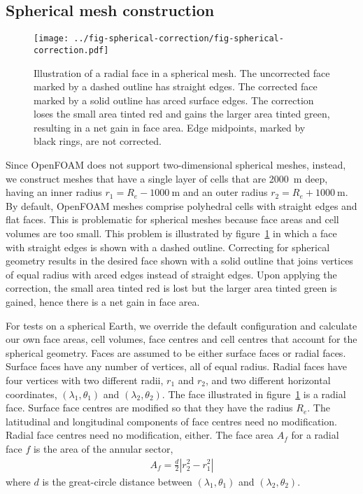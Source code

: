 \subsection*{Spherical mesh construction}

\begin{figure}
	\centering
	\texttt{[image: ../fig-spherical-correction/fig-spherical-correction.pdf]}
	\caption{Illustration of a radial face in a spherical mesh.  The uncorrected face marked by a dashed outline has straight edges.  The corrected face marked by a solid outline has arced surface edges.
	The correction loses the small area tinted red and gains the larger area tinted green, resulting in a net gain in face area.
	Edge midpoints, marked by black rings, are not corrected.}
	\label{fig:spherical-correction}
\end{figure}

Since OpenFOAM does not support two-dimensional spherical meshes, instead, we construct meshes that have a single layer of cells that are \SI{2000}{\meter} deep, having an inner radius $r_1 = R_e - \SI{1000}{\meter}$ and an outer radius $r_2 = R_e + \SI{1000}{\meter}$.
By default, OpenFOAM meshes comprise polyhedral cells with straight edges and flat faces.  This is problematic for spherical meshes because face areas and cell volumes are too small.  This problem is illustrated by figure~\ref{fig:spherical-correction} in which a face with straight edges is shown with a dashed outline.
Correcting for spherical geometry results in the desired face shown with a solid outline that joins vertices of equal radius with arced edges instead of straight edges.  Upon applying the correction, the small area tinted red is lost but the larger area tinted green is gained, hence there is a net gain in face area.

For tests on a spherical Earth, we override the default configuration and calculate our own face areas, cell volumes, face centres and cell centres that account for the spherical geometry.  
Faces are assumed to be either surface faces or radial faces.  Surface faces have any number of vertices, all of equal radius.  Radial faces have four vertices with two different radii, $r_1$ and $r_2$, and two different horizontal coordinates, $(\lambda_1, \theta_1)$ and $(\lambda_2, \theta_2)$.  The face illustrated in figure~\ref{fig:spherical-correction} is a radial face.
Surface face centres are modified so that they have the radius $R_e$.  The latitudinal and longitudinal components of face centres need no modification.  Radial face centres need no modification, either.
The face area $A_f$ for a radial face $f$ is the area of the annular sector,
\begin{align}
	A_f = \frac{d}{2} \left\lvert r_2^2 - r_1^2 \right\rvert
\end{align}
where $d$ is the great-circle distance between $(\lambda_1, \theta_1)$ and $(\lambda_2, \theta_2)$.

